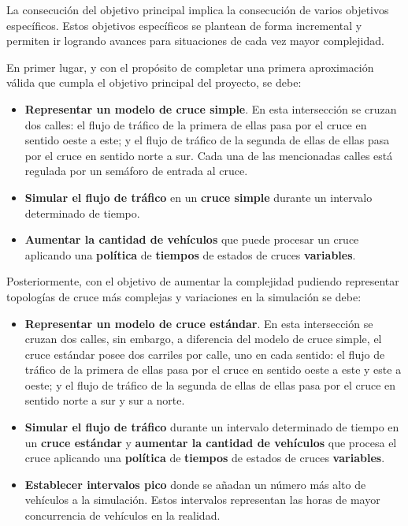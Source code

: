 La consecución del objetivo principal implica la consecución de varios objetivos específicos. Estos objetivos específicos se plantean de forma incremental y permiten ir logrando avances para situaciones de cada vez mayor complejidad.

En primer lugar, y con el propósito de completar una primera aproximación válida que cumpla el objetivo principal del proyecto, se debe:
\begin{itemize}
    \item \textbf{Representar un modelo de cruce simple}. En esta intersección se cruzan dos calles: el flujo de tráfico de la primera de ellas pasa por el cruce en sentido oeste a este; y el flujo de tráfico de la segunda de ellas de ellas pasa por el cruce en sentido norte a sur. Cada una de las mencionadas calles está regulada por un semáforo de entrada al cruce.
    \item \textbf{Simular el flujo de tráfico} en un \textbf{cruce simple} durante un intervalo determinado de tiempo.
    \item \textbf{Aumentar la cantidad de vehículos} que puede procesar un cruce aplicando una \textbf{política} de \textbf{tiempos} de estados de cruces \textbf{variables}.
\end{itemize}

Posteriormente, con el objetivo de aumentar la complejidad pudiendo representar topologías de cruce más complejas y variaciones en la simulación se debe:
\begin{itemize}
    \item \textbf{Representar un modelo de cruce estándar}. En esta intersección se cruzan dos calles, sin embargo, a diferencia del modelo de cruce simple, el cruce estándar posee dos carriles por calle, uno en cada sentido: el flujo de tráfico de la primera de ellas pasa por el cruce en sentido oeste a este y este a oeste; y el flujo de tráfico de la segunda de ellas de ellas pasa por el cruce en sentido norte a sur y sur a norte.
    \item \textbf{Simular el flujo de tráfico} durante un intervalo determinado de tiempo en un \textbf{cruce estándar} y \textbf{aumentar la cantidad de vehículos} que procesa el cruce aplicando una \textbf{política} de \textbf{tiempos} de estados de cruces \textbf{variables}.
    \item \textbf{Establecer intervalos pico} donde se añadan un número más alto de vehículos a la simulación. Estos intervalos representan las horas de mayor concurrencia de vehículos en la realidad.
\end{itemize}


